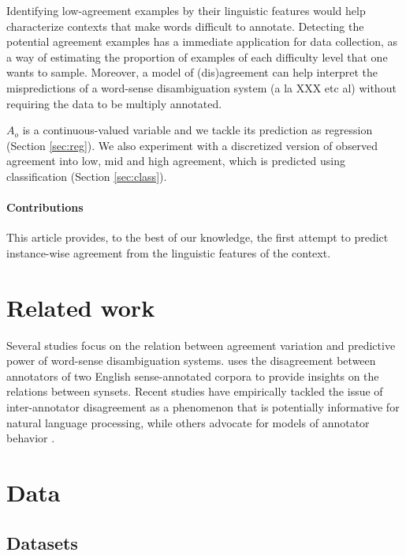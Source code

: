 \documentclass[11pt,a4paper]{article}
\begin{document}
Identifying low-agreement examples by their linguistic features would help characterize contexts that make words difficult to annotate. Detecting the potential agreement examples has a immediate application for data collection, as a way of estimating the proportion of examples of each difficulty level that one wants to sample. Moreover, a model of (dis)agreement can help interpret the mispredictions of a word-sense disambiguation system (a la XXX etc al) without requiring the data to be multiply annotated. 

$A_o$ is a continuous-valued variable and we tackle its prediction as regression (Section \ref{sec:reg}). We also experiment with a discretized version of observed agreement into low, mid and high agreement, which is predicted using classification (Section \ref{sec:class}).  

\paragraph{Contributions} This article provides, to the best of our knowledge, the first attempt to predict instance-wise agreement from the linguistic features of the context.
\section{Related work}

Several studies \cite{Yarowsky2002,Lopez2015} focus on the relation between agreement variation and predictive power of word-sense disambiguation systems. 
 uses the disagreement between annotators of two English sense-annotated corpora to provide insights on the relations between synsets. Recent studies \cite{Plank2014,Jurgens2013,Jurgens2014} have empirically tackled the issue of inter-annotator disagreement as a phenomenon that is potentially informative for natural language processing, while others advocate for models of annotator behavior \cite{Passonneau2014,Cohn2013}. 

\section{Data}
\subsection{Datasets}
\end{document}
